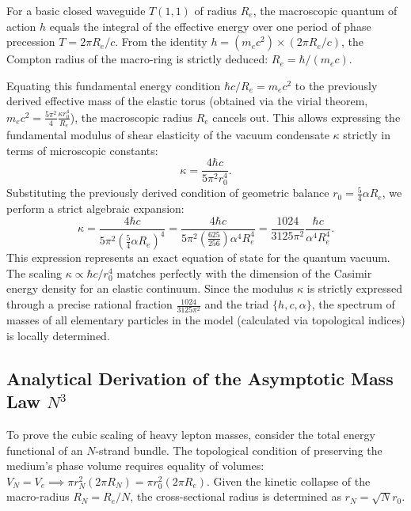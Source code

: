 \documentclass[11pt,a4paper]{article}
\begin{document}
For a basic closed waveguide $T(1,1)$ of radius $R_e$, the macroscopic quantum of action $h$ equals the integral of the effective energy over one period of phase precession $T = 2\pi R_e/c$. From the identity $h = (m_e c^2) \times (2\pi R_e/c)$, the Compton radius of the macro-ring is strictly deduced: $R_e = \hbar / (m_e c)$.

Equating this fundamental energy condition $\hbar c / R_e = m_e c^2$ to the previously derived effective mass of the elastic torus (obtained via the virial theorem, $m_e c^2 = \frac{5\pi^2}{4} \frac{\kappa r_0^4}{R_e}$), the macroscopic radius $R_e$ cancels out. This allows expressing the fundamental modulus of shear elasticity of the vacuum condensate $\kappa$ strictly in terms of microscopic constants:
\begin{equation}
\kappa = \frac{4 \hbar c}{5\pi^2 r_0^4}.
\end{equation}
Substituting the previously derived condition of geometric balance $r_0 = \frac{5}{4}\alpha R_e$, we perform a strict algebraic expansion:
\begin{equation}
\kappa = \frac{4 \hbar c}{5\pi^2 \left( \frac{5}{4}\alpha R_e \right)^4} = \frac{4 \hbar c}{5\pi^2 \left( \frac{625}{256} \right) \alpha^4 R_e^4} = \frac{1024}{3125 \pi^2} \frac{\hbar c}{\alpha^4 R_e^4}.
\end{equation}
This expression represents an exact equation of state for the quantum vacuum. The scaling $\kappa \propto \hbar c / r_0^4$ matches perfectly with the dimension of the Casimir energy density for an elastic continuum.
Since the modulus $\kappa$ is strictly expressed through a precise rational fraction $\frac{1024}{3125\pi^2}$ and the triad $\{h, c, \alpha\}$, the spectrum of masses of all elementary particles in the model (calculated via topological indices) is locally determined.

\subsection{Analytical Derivation of the Asymptotic Mass Law $N^3$}
To prove the cubic scaling of heavy lepton masses, consider the total energy functional of an $N$-strand bundle. The topological condition of preserving the medium's phase volume requires equality of volumes: $V_N = V_e \implies \pi r_N^2 (2\pi R_N) = \pi r_0^2 (2\pi R_e)$. Given the kinetic collapse of the macro-radius $R_N = R_e / N$, the cross-sectional radius is determined as $r_N = \sqrt{N} r_0$.
\end{document}
